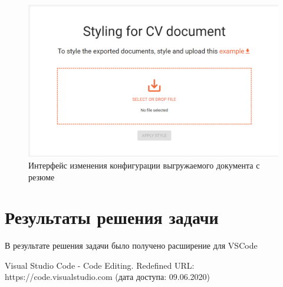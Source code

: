 \documentclass[a4paper,12pt]{diplom}
\begin{document}
\begin{figure}[!ht]
\centering
\includegraphics[width=1\textwidth]{resources/doc.png}
\caption{Интерфейс изменения конфигурации выгружаемого документа с резюме}
\label{20}
\end{figure}

\chapter{Результаты решения задачи}

В результате решения задачи было получено расширение для VSCode


\renewcommand{\bibname}{Список литературы}
\begin{thebibliography}{9}

Visual Studio Code - Code Editing. Redefined
URL: https://code.visualstudio.com
(дата доступа: 09.06.2020)

\end{thebibliography}
\end{document}
